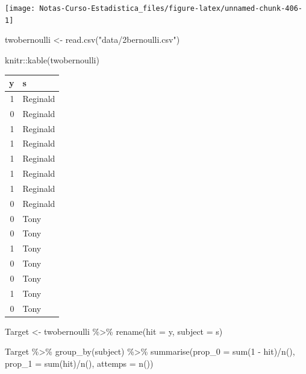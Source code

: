 \documentclass[
  12pt,
]{book}
\newenvironment{Shaded}{\begin{snugshade}}{\end{snugshade}}
\newcommand{\AttributeTok}[1]{\textcolor[rgb]{0.77,0.63,0.00}{#1}}
\newcommand{\DecValTok}[1]{\textcolor[rgb]{0.00,0.00,0.81}{#1}}
\newcommand{\FunctionTok}[1]{\textcolor[rgb]{0.00,0.00,0.00}{#1}}
\newcommand{\NormalTok}[1]{#1}
\newcommand{\OtherTok}[1]{\textcolor[rgb]{0.56,0.35,0.01}{#1}}
\newcommand{\SpecialCharTok}[1]{\textcolor[rgb]{0.00,0.00,0.00}{#1}}
\newcommand{\StringTok}[1]{\textcolor[rgb]{0.31,0.60,0.02}{#1}}
\theoremstyle{definition}
\theoremstyle{definition}
\theoremstyle{definition}
\theoremstyle{definition}
\theoremstyle{remark}
\begin{document}
\begin{center}\texttt{[image: Notas-Curso-Estadistica\_files/figure-latex/unnamed-chunk-406-1]} \end{center}

\begin{Shaded}
\begin{Highlighting}[]
\NormalTok{twobernoulli }\OtherTok{\textless{}{-}} \FunctionTok{read.csv}\NormalTok{(}\StringTok{"data/2bernoulli.csv"}\NormalTok{)}

\NormalTok{knitr}\SpecialCharTok{::}\FunctionTok{kable}\NormalTok{(twobernoulli)}
\end{Highlighting}
\end{Shaded}

\begin{tabular}{r|l}
\hline
y & s\\
\hline
1 & Reginald\\
\hline
0 & Reginald\\
\hline
1 & Reginald\\
\hline
1 & Reginald\\
\hline
1 & Reginald\\
\hline
1 & Reginald\\
\hline
1 & Reginald\\
\hline
0 & Reginald\\
\hline
0 & Tony\\
\hline
0 & Tony\\
\hline
1 & Tony\\
\hline
0 & Tony\\
\hline
0 & Tony\\
\hline
1 & Tony\\
\hline
0 & Tony\\
\hline
\end{tabular}

\begin{Shaded}
\begin{Highlighting}[]
\NormalTok{Target }\OtherTok{\textless{}{-}}\NormalTok{ twobernoulli }\SpecialCharTok{\%\textgreater{}\%}
    \FunctionTok{rename}\NormalTok{(}\AttributeTok{hit =}\NormalTok{ y, }\AttributeTok{subject =}\NormalTok{ s)}

\NormalTok{Target }\SpecialCharTok{\%\textgreater{}\%}
    \FunctionTok{group\_by}\NormalTok{(subject) }\SpecialCharTok{\%\textgreater{}\%}
    \FunctionTok{summarise}\NormalTok{(}\AttributeTok{prop\_0 =} \FunctionTok{sum}\NormalTok{(}\DecValTok{1} \SpecialCharTok{{-}}\NormalTok{ hit)}\SpecialCharTok{/}\FunctionTok{n}\NormalTok{(), }\AttributeTok{prop\_1 =} \FunctionTok{sum}\NormalTok{(hit)}\SpecialCharTok{/}\FunctionTok{n}\NormalTok{(),}
        \AttributeTok{attemps =} \FunctionTok{n}\NormalTok{())}
\end{Highlighting}
\end{Shaded}
\end{document}
